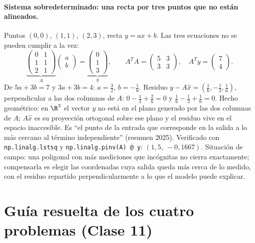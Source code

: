 \paragraph{Sistema sobredeterminado: una recta por tres puntos que no están alineados.}
Puntos \((0,0)\), \((1,1)\), \((2,3)\), recta \(y=ax+b\). Las tres ecuaciones no se pueden
cumplir a la vez:
\[
  \underbrace{\begin{pmatrix}0&1\\1&1\\2&1\end{pmatrix}}_{A}
  \begin{pmatrix}a\\b\end{pmatrix}
  =\underbrace{\begin{pmatrix}0\\1\\3\end{pmatrix}}_{y},\qquad
  A^TA=\begin{pmatrix}5&3\\3&3\end{pmatrix},\quad A^Ty=\begin{pmatrix}7\\4\end{pmatrix}.
\]
De \(5a+3b=7\) y \(3a+3b=4\): \(a=\tfrac32\), \(b=-\tfrac16\). Residuo
\(y-A\hat x=(\tfrac16,-\tfrac13,\tfrac16)\), perpendicular a las dos columnas de \(A\):
\(0-\tfrac13+\tfrac26=0\) y \(\tfrac16-\tfrac13+\tfrac16=0\). Hecho geométrico: en
\(\R^3\) el vector \(y\) no está en el plano generado por las dos columnas de \(A\);
\(A\hat x\) es su proyección ortogonal sobre ese plano y el residuo vive en el espacio
inaccesible. Es ``el punto de la entrada que corresponde en la salida a lo más cercano al
término independiente'' (resumen 2025). Verificado con \texttt{np.linalg.lstsq} y
\texttt{np.linalg.pinv(A) @ y}: \((1{,}5,\ -0{,}1667)\). Situación de campo: una poligonal
con más mediciones que incógnitas no cierra exactamente; compensarla es elegir las
coordenadas cuya salida queda más cerca de lo medido, con el residuo repartido
perpendicularmente a lo que el modelo puede explicar.

\section{Guía resuelta de los cuatro problemas (Clase 11)}\label{sec:cuatro-problemas}

{\small\vspace{1mm}\par}


